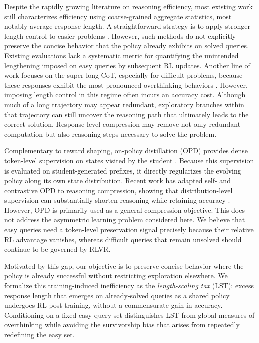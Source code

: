 \documentclass{article} %
\begin{document}
Despite the rapidly growing literature on reasoning efficiency, most existing work still characterizes efficiency using coarse-grained aggregate statistics, most notably average response length. A straightforward strategy is to apply stronger length control to easier problems \citep{shen2025dast,xu2026adapthink}. However, such methods do not explicitly preserve the concise behavior that the policy already exhibits on solved queries. Existing evaluations lack a systematic metric for quantifying the unintended lengthening imposed on easy queries by subsequent RL updates. Another line of work focuses on the super-long CoT, especially for difficult problems, because these responses exhibit the most pronounced overthinking behaviors \citep{yuan2026shorten,yi2026shorterbetter,xiang2025just,chen2024not,luo2026o1}. However, imposing length control in this regime often incurs an accuracy cost. Although much of a long trajectory may appear redundant, exploratory branches within that trajectory can still uncover the reasoning path that ultimately leads to the correct solution. Response-level compression may remove not only redundant computation but also reasoning steps necessary to solve the problem.

Complementary to reward shaping, on-policy distillation (OPD) provides dense token-level supervision on states visited by the student \citep{agarwal2024onpolicy}. Because this supervision is evaluated on student-generated prefixes, it directly regularizes the evolving policy along its own state distribution. Recent work has adapted self- and contrastive OPD to reasoning compression, showing that distribution-level supervision can
substantially shorten reasoning while retaining accuracy
\citep{sang2026opsdc,ruan2026contrastive}. However, OPD is
primarily used as a general compression objective. This does not address the asymmetric learning problem considered here. We believe that easy queries need a token-level preservation signal precisely because their relative RL advantage vanishes, whereas difficult queries that remain unsolved should continue to be governed by RLVR.

Motivated by this gap, our objective is to preserve
concise behavior where the policy is already successful without restricting exploration elsewhere. We formalize this training-induced inefficiency as the
\emph{length-scaling tax} (LST): excess response length that emerges on already-solved queries as a shared policy undergoes RL post-training, without a commensurate gain in accuracy. 
Conditioning on a fixed easy query set distinguishes LST from global measures of overthinking while avoiding the survivorship bias that arises from repeatedly redefining the easy set.
\end{document}
